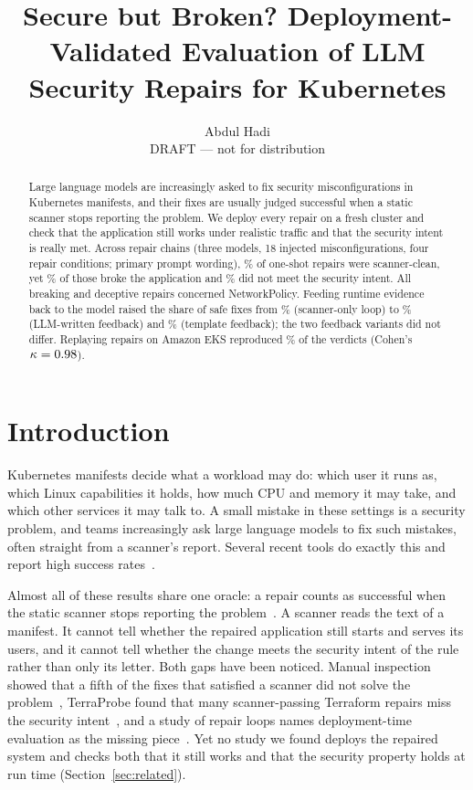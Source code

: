 \documentclass[10pt]{article}
\title{Secure but Broken? Deployment-Validated Evaluation of LLM Security Repairs for Kubernetes}
\author{Abdul Hadi \\ \small DRAFT --- not for distribution}
\date{}
\begin{document}
\maketitle

\begin{abstract}
Large language models are increasingly asked to fix security misconfigurations in Kubernetes manifests, and their
fixes are usually judged successful when a static scanner stops reporting the problem. We deploy every repair on a
fresh cluster and check that the application still works under realistic traffic and that the security intent is
really met. Across \WzeroChains{} repair chains (three models, 18 injected misconfigurations, four repair
conditions; primary prompt wording), \WzeroCzeroViewScannerCleanPct\% of one-shot repairs were scanner-clean, yet
\WzeroCzeroViewOfWhichBreakingPct\% of those broke the application and \WzeroCzeroViewOfWhichDeceptivePct\% did not
meet the security intent. All breaking and deceptive repairs concerned NetworkPolicy. Feeding runtime evidence back
to the model raised the share of safe fixes from \WzeroConeSafePct\% (scanner-only loop) to
\WzeroCtwoLLMSafePct\% (LLM-written feedback) and \WzeroCtwoTemplateSafePct\% (template feedback); the two feedback
variants did not differ. Replaying \PeightAgreeN{} repairs on Amazon EKS reproduced \PeightAgreePct\% of the verdicts
(Cohen's $\kappa = 0.98$).
\end{abstract}

\section{Introduction}
Kubernetes manifests decide what a workload may do: which user it runs as, which Linux capabilities it holds, how much
CPU and memory it may take, and which other services it may talk to. A small mistake in these settings is a security
problem, and teams increasingly ask large language models to fix such mistakes, often straight from a scanner's
report. Several recent tools do exactly this and report high success rates~\cite{R0171,R0494,R0382}.

Almost all of these results share one oracle: a repair counts as successful when the static scanner stops reporting the
problem~\cite{R0171,R0399,R0494}. A scanner reads the text of a manifest. It cannot tell whether the repaired
application still starts and serves its users, and it cannot tell whether the change meets the security intent of the
rule rather than only its letter. Both gaps have been noticed. Manual inspection showed that a fifth of the fixes that
satisfied a scanner did not solve the problem~\cite{R0049}, TerraProbe found that many scanner-passing Terraform repairs
miss the security intent~\cite{R0340}, and a study of repair loops names deployment-time evaluation as the missing
piece~\cite{R0330}. Yet no study we found deploys the repaired system and checks both that it still works and that the
security property holds at run time (Section~\ref{sec:related}).
\end{document}
